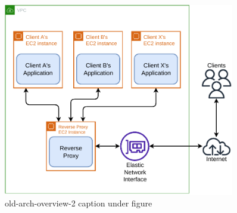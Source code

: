 \begin{figure}[!htbp]
    \centering
    \includegraphics[width=0.90\textwidth]{img/diagrams/pdf/old-arch-overview-2.drawio.pdf}
    \caption[old-arch-overview-2 listing]{old-arch-overview-2 caption under figure}
    \label{fig:old-arch-overview-2}
\end{figure}
